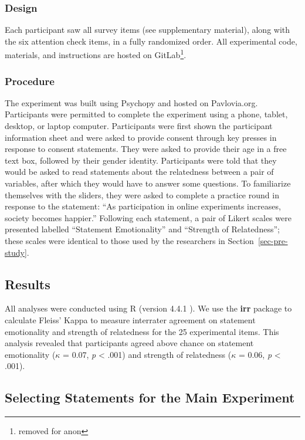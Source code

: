 \documentclass[manuscript,screen,review,anonymous]{acmart}
\begin{document}
\subsubsection{Design}\label{sec-design-pre}

Each participant saw all survey items (see supplementary material),
along with the six attention check items, in a fully randomized order.
All experimental code, materials, and instructions are hosted on
GitLab\footnote{removed for anon}.

\subsubsection{Procedure}\label{sec-procedure-pre}

The experiment was built using Psychopy \citep{pierce_2019} and hosted
on Pavlovia.org. Participants were permitted to complete the experiment
using a phone, tablet, desktop, or laptop computer. Participants were
first shown the participant information sheet and were asked to provide
consent through key presses in response to consent statements. They were
asked to provide their age in a free text box, followed by their gender
identity. Participants were told that they would be asked to read
statements about the relatedness between a pair of variables, after
which they would have to answer some questions. To familiarize
themselves with the sliders, they were asked to complete a practice
round in response to the statement: ``As participation in online
experiments increases, society becomes happier.'' Following each
statement, a pair of Likert scales were presented labelled ``Statement
Emotionality'' and ``Strength of Relatedness''; these scales were
identical to those used by the researchers in
Section~\ref{sec-pre-study}.

\subsection{Results}\label{sec-results-pre}

All analyses were conducted using R (version 4.4.1 \citep{rcore}). We
use the \textbf{irr} package to calculate Fleiss' Kappa to measure
interrater agreement on statement emotionality and strength of
relatedness for the 25 experimental items. This analysis revealed that
participants agreed above chance on statement emotionality (\(\kappa\) =
0.07, \emph{p} \textless{} .001) and strength of relatedness (\(\kappa\)
= 0.06, \emph{p} \textless{} .001).

\subsection{Selecting Statements for the Main
Experiment}\label{sec-selecting-statements}
\end{document}
